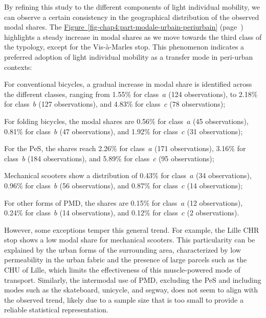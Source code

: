 \begin{refsegment}
By refining this study to the different components of light individual mobility, we can observe a certain consistency in the geographical distribution of the observed modal shares. The \hyperref[fig-chap4:part-modale-urbain-periurbain]{Figure~\ref{fig-chap4:part-modale-urbain-periurbain}} (page~\pageref{fig-chap4:part-modale-urbain-periurbain}) highlights a steady increase in modal shares as we move towards the third class of the typology, except for the Vis-à-Marles stop. This phenomenon indicates a preferred adoption of light individual mobility as a transfer mode in peri-urban contexts:
    \begin{customitemize}
\item For conventional bicycles, a gradual increase in modal share is identified across the different classes, ranging from 1.55\% for class~\(a\) (124 observations), to 2.18\% for class~\(b\) (127 observations), and 4.83\% for class~\(c\) (78 observations);
\item For folding bicycles, the modal shares are 0.56\% for class~\(a\) (45 observations), 0.81\% for class~\(b\) (47 observations), and 1.92\% for class~\(c\) (31 observations);
\item For the \acrshort{PeS}, the shares reach 2.26\% for class~\(a\) (171 observations), 3.16\% for class~\(b\) (184 observations), and 5.89\% for class~\(c\) (95 observations);
\item Mechanical scooters show a distribution of 0.43\% for class~\(a\) (34 observations), 0.96\% for class~\(b\) (56 observations), and 0.87\% for class~\(c\) (14 observations);
\item For other forms of \acrshort{PMD}, the shares are 0.15\% for class~\(a\) (12 observations), 0.24\% for class~\(b\) (14 observations), and 0.12\% for class~\(c\) (2 observations).
    \end{customitemize}%

However, some exceptions temper this general trend. For example, the Lille CHR stop shows a low modal share for mechanical scooters. This particularity can be explained by the urban forms of the surrounding area, characterized by low permeability in the urban fabric and the presence of large parcels such as the \acrfull{CHU} of Lille, which limits the effectiveness of this muscle-powered mode of transport. Similarly, the intermodal use of \acrshort{PMD}, excluding the \acrshort{PeS} and including modes such as the skateboard, unicycle, and segway, does not seem to align with the observed trend, likely due to a sample size that is too small to provide a reliable statistical representation.%


\end{refsegment}
